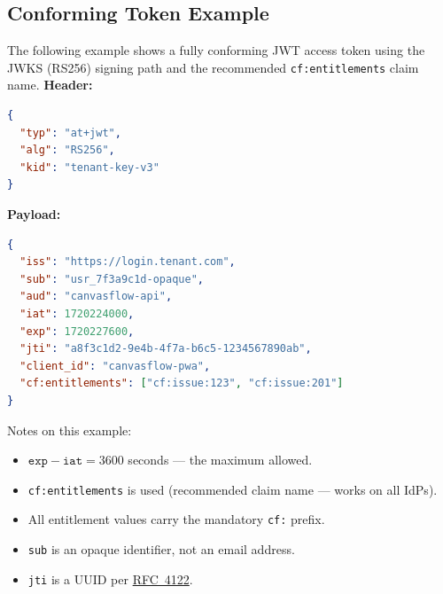 \pagebreak

\subsection{Conforming Token Example}

The following example shows a fully conforming JWT access token using the JWKS (RS256)
signing path and the recommended \texttt{cf:entitlements} claim name.
\linebreak\linebreak
\textbf{Header:}

\begin{lstlisting}[language=json]
{
  "typ": "at+jwt",
  "alg": "RS256",
  "kid": "tenant-key-v3"
}
\end{lstlisting}

\textbf{Payload:}

\begin{lstlisting}[language=json]
{
  "iss": "https://login.tenant.com",
  "sub": "usr_7f3a9c1d-opaque",
  "aud": "canvasflow-api",
  "iat": 1720224000,
  "exp": 1720227600,
  "jti": "a8f3c1d2-9e4b-4f7a-b6c5-1234567890ab",
  "client_id": "canvasflow-pwa",
  "cf:entitlements": ["cf:issue:123", "cf:issue:201"]
}
\end{lstlisting}



Notes on this example:
\begin{itemize}
  \item $\texttt{exp} - \texttt{iat} = 3600$ seconds --- the maximum allowed.
  \item \texttt{cf:entitlements} is used (recommended claim name --- works on all IdPs).
  \item All entitlement values carry the mandatory \texttt{cf:} prefix.
  \item \texttt{sub} is an opaque identifier, not an email address.
  \item \texttt{jti} is a UUID per \href{https://datatracker.ietf.org/doc/html/rfc4122}{RFC~4122}.
\end{itemize}

